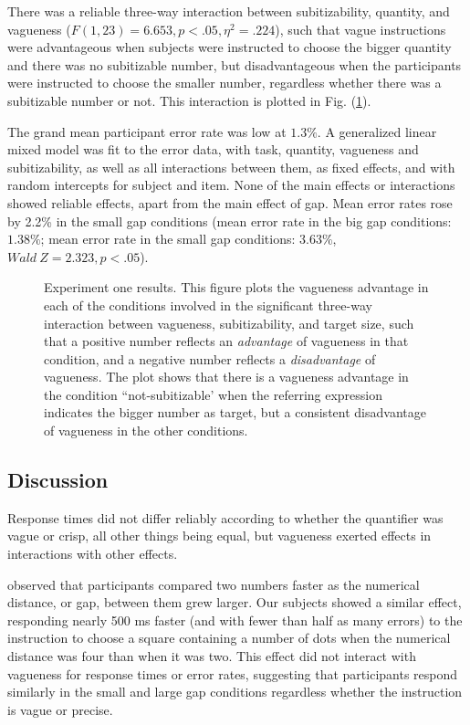 \documentclass[doc,floatmark]{apa}
\begin{document}
There was a reliable three-way interaction between subitizability, quantity, and vagueness ($F(1,23)=6.653,p<.05,\eta^2=.224$), such that vague instructions were advantageous when subjects were instructed to choose the bigger quantity and there was no subitizable number, but disadvantageous when the participants were instructed to choose the smaller number, regardless whether there was a subitizable number or not. This interaction is plotted in Fig. (\ref{resultse1}).

The grand mean participant error rate was low at $1.3\%$. A generalized linear mixed model \cite{jaeger2008categorical} was fit to the error data, with task, quantity, vagueness and subitizability, as well as all interactions between them, as fixed effects, and with random intercepts for subject and item. None of the main effects or interactions showed reliable effects, apart from the main effect of gap. Mean error rates rose by 2.2\% in the small gap conditions (mean error rate in the big gap conditions: $1.38\%$; mean error rate in the small gap conditions: $3.63\%$, $Wald~Z = 2.323, p<.05 $).

\begin{figure}[tbp]
\caption{Experiment one results. This figure plots the vagueness advantage in each of the conditions involved in the significant three-way interaction between vagueness, subitizability, and target size, such that a positive number reflects an \emph{advantage} of vagueness in that condition, and a negative number reflects a \emph{disadvantage} of vagueness. The plot shows that there is a vagueness advantage in the  condition ``not-subitizable'  when the referring expression indicates the bigger number as target, but a consistent disadvantage of vagueness in the other conditions.}
\label{resultse1}
\end{figure}

\subsection{Discussion}
Response times did not differ reliably according to whether the quantifier was vague or crisp, all other things being equal, but vagueness exerted effects in interactions with other effects.

 observed that participants compared two numbers faster as the numerical distance, or gap, between them grew larger. Our subjects showed a similar effect, responding nearly 500 ms faster (and with fewer than half as many errors) to the instruction to choose a square containing a number of dots when the numerical distance was four than when it was two. This effect did not interact with vagueness for response times or error rates, suggesting that  participants respond similarly in the small and large gap conditions regardless whether the instruction is vague or precise.
\end{document}
